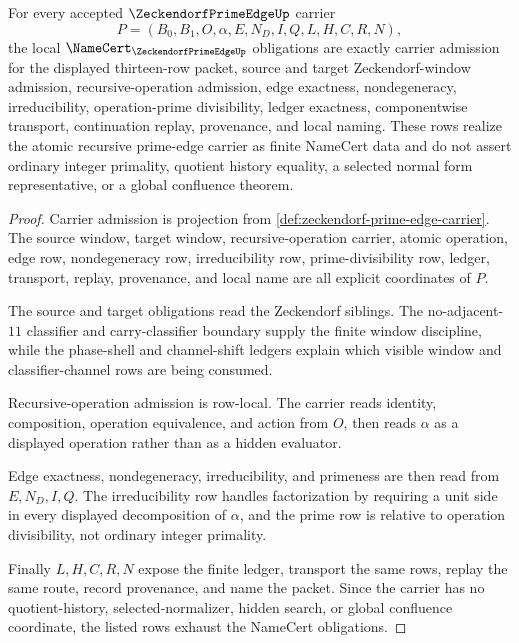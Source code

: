 \begin{theorem}
\label{thm:zeckendorf-prime-edge-namecert-obligations}
For every accepted $\ZeckendorfPrimeEdgeUp$ carrier
$$
P=(B_0,B_1,O,\alpha,E,N_D,I,Q,L,H,C,R,N),
$$
the local $\NameCert_{\ZeckendorfPrimeEdgeUp}$ obligations are exactly carrier admission for the displayed thirteen-row packet, source and target Zeckendorf-window admission, recursive-operation admission, edge exactness, nondegeneracy, irreducibility, operation-prime divisibility, ledger exactness, componentwise transport, continuation replay, provenance, and local naming. These rows realize the atomic recursive prime-edge carrier as finite NameCert data and do not assert ordinary integer primality, quotient history equality, a selected normal form representative, or a global confluence theorem.
\end{theorem}
\begin{proof}
Carrier admission is projection from \autoref{def:zeckendorf-prime-edge-carrier}. The source window, target window, recursive-operation carrier, atomic operation, edge row, nondegeneracy row, irreducibility row, prime-divisibility row, ledger, transport, replay, provenance, and local name are all explicit coordinates of $P$.

The source and target obligations read the Zeckendorf siblings. The no-adjacent-$11$ classifier and carry-classifier boundary supply the finite window discipline, while the phase-shell and channel-shift ledgers explain which visible window and classifier-channel rows are being consumed.

Recursive-operation admission is row-local. The carrier reads identity, composition, operation equivalence, and action from $O$, then reads $\alpha$ as a displayed operation rather than as a hidden evaluator.

Edge exactness, nondegeneracy, irreducibility, and primeness are then read from $E,N_D,I,Q$. The irreducibility row handles factorization by requiring a unit side in every displayed decomposition of $\alpha$, and the prime row is relative to operation divisibility, not ordinary integer primality.

Finally $L,H,C,R,N$ expose the finite ledger, transport the same rows, replay the same route, record provenance, and name the packet. Since the carrier has no quotient-history, selected-normalizer, hidden search, or global confluence coordinate, the listed rows exhaust the NameCert obligations.
\end{proof}

